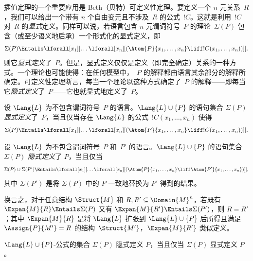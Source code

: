 \documentclass[../../../include/open-logic-section]{subfiles}
\begin{document}


插值定理的一个重要应用是 Beth（贝特）可定义性定理。要定义一个 $n$ 元关系~$R$，我们可以给出一个带有 $n$ 个自由变元且不涉及~$R$ 的公式~$!C$。这就是利用~$!C$ 对~$R$ 的\emph{显式}定义。同样可以说，若语言包含 $n$ 元谓词符号~$P$ 的理论~$\Sigma(P)$ 包含（或至少语义地后承）一个形式化的显式定义，即
\[
\Sigma(P) \Entails \lforall[x_1][\dots
  \lforall[x_n][(\Atom{P}{x_1,\dots, x_n} \liff !C(x_1, \dots,
    x_n))]].
\]
则它\emph{显式定义}了~$P$。但是，显式定义仅仅是定义（即完全确定）关系的一种方式。一个理论也可能使得：在任何模型中，~$P$ 的解释都由语言其余部分的解释所确定。可定义性定理断言，每当一个理论以这种方式确定了~$P$ 的解释——即每当它\emph{隐式定义}了~$P$——它也就显式地定义了~$P$。

\begin{defn}
设 $\Lang{L}$ 为不包含谓词符号~$P$ 的语言。$\Lang{L} \cup \{P\}$ 的语句集合 $\Sigma(P)$ \emph{显式定义}了~$P$，当且仅当存在 $\Lang{L}$ 的公式~$!C(x_1, \dots, x_n)$ 使得
\[
\Sigma(P) \Entails \lforall[x_1][\dots
  \lforall[x_n][(\Atom{P}{x_1,\dots, x_n} \liff !C(x_1, \dots,
    x_n))]].
\]
\end{defn}

\begin{defn}
设 $\Lang{L}$ 为不包含谓词符号~$P$ 和~$P'$ 的语言。$\Lang{L} \cup \{P\}$ 的语句集合 $\Sigma(P)$ \emph{隐式定义}了 $P$，当且仅当
\[
\Sigma(P) \cup \Sigma(P') \Entails \lforall[x_1][\dots
  \lforall[x_n][(\Atom{P}{x_1,\dots, x_n} \liff \Atom{P'}{x_1,\dots,
      x_n})]],
\]
其中 $\Sigma(P')$ 是将 $\Sigma(P)$ 中的 $P$ 一致地替换为 $P'$ 得到的结果。
\end{defn}

换言之，对于任意结构 $\Struct{M}$ 和 $R, R' \subseteq
\Domain{M}^n$，若既有 $\Expan{M}{R} \Entails \Sigma(P)$ 又有 $\Expan{M}{R'} \Entails \Sigma(P')$，则 $R=R'$；其中 $\Expan{M}{R}$ 是将 $\Lang{L}$ 扩张到 $\Lang{L} \cup \{P\}$ 后所得且满足 $\Assign{P}{M'} = R$ 的结构~$\Struct{M'}$，$\Expan{M}{R'}$ 类似定义。

\begin{thm}
$\Lang{L} \cup\{P\}$-公式的集合 $\Sigma(P)$ 隐式定义 $P$，当且仅当 $\Sigma(P)$ 显式定义 $P$。
\end{thm}
\end{document}
